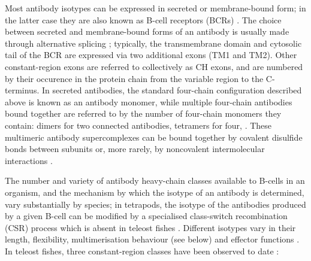 Most antibody isotypes can be expressed in secreted or membrane-bound form; in the latter case they are also known as B-cell receptors (BCRs) \parencite{bengten2015fishantibodies}. The choice between secreted and membrane-bound forms of an antibody is usually made through alternative splicing \parencite{bengten2015fishantibodies,mashoof2016immunoglobulins}; typically, the transmembrane domain and cytosolic tail of the BCR are expressed via two additional exons (TM1 and TM2). Other constant-region exons are referred to collectively as CH exons, and are numbered by their occurence in the protein chain from the variable region to the C-terminus. In secreted antibodies, the standard four-chain configuration described above is known as an antibody monomer, while multiple four-chain antibodies bound together are referred to by the number of four-chain monomers they contain: dimers for two connected antibodies, tetramers for four, \etc \parencite{schroeder2010immunoglobulins}. These multimeric antibody supercomplexes can be bound together by covalent disulfide bonds between subunits \parencite{schroeder2010immunoglobulins} or, more rarely, by noncovalent intermolecular interactions \parencite{zhang2010igtgut}.

The number and variety of antibody heavy-chain classes available to B-cells in an organism, and the mechanism by which the isotype of an antibody is determined, vary substantially by species; in tetrapods, the isotype of the antibodies produced by a given B-cell can be modified by a specialised class-switch recombination (CSR) process which is absent in teleost fishes \parencite{senger2015switching}. Different isotypes vary in their length, flexibility, multimerisation behaviour (see below) and effector functions \parencite{schroeder2010immunoglobulins,senger2015switching}. In teleost fishes, three constant-region classes have been observed to date \parencite{bengten2015fishantibodies,mashoof2016immunoglobulins,fillatreau2013astonishing}:

